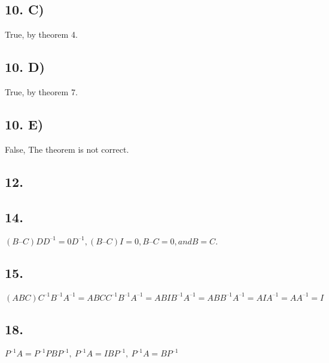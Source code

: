 \documentclass[12]{scrartcl}
\begin{document}
\subsection*{10. C)}
True, by theorem 4. 
\subsection*{10. D)}
True, by theorem 7. 
\subsection*{10. E)}
False, The theorem is not correct. 
\subsection*{12.}

\subsection*{14.}
$(B–C)DD^{–1} =0D^{–1}, (B–C)I=0, B–C=0, and B=C.$
\subsection*{15.}
$(ABC) C^{–1}B^{–1}A^{–1} = ABCC^{–1}B^{–1}A^{–1} = ABIB^{–1}A^{–1} = ABB^{–1}A^{–1} = AIA^{–1} = AA^{–1} = I$
\subsection*{18.}
$P^{–1}A = P^{–1}PBP^{–1}, \ P^{–1}A = IBP^{–1}, \ P^{–1}A = BP^{–1}$
\end{document}
